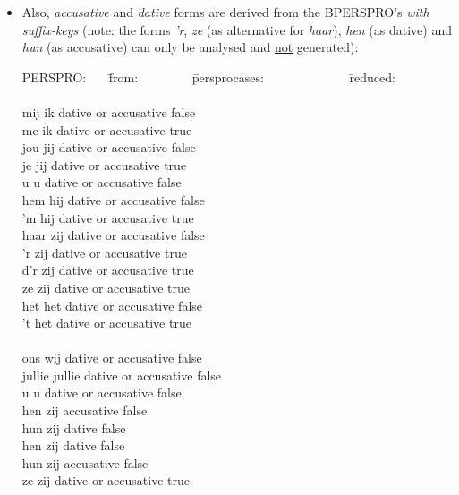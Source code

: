 \begin{itemize}
  \item Also, {\em accusative} and {\em dative} forms are derived from the 
        BPERSPRO's {\em with suffix-keys} (note: the forms
        {\em 'r}, {\em ze} (as alternative for {\em haar}), 
        {\em hen} (as dative) and {\em hun} (as accusative) can only be 
        analysed and \underline{not} generated):

\begin{tabbing}
PERSPRO: \ \ \  \= from: \ \ \ \ \ \ \ \ \= persprocases: \ \ \ \ \ \ \  
\ \ \ \ \ \  \= reduced: \\
         \>                \>                    \>       \\
mij      \> ik             \> dative or accusative  \> false \\
me       \> ik             \> dative or accusative  \> true  \\
jou      \> jij            \> dative or accusative  \> false \\
je       \> jij            \> dative or accusative  \> true  \\
u        \> u              \> dative or accusative  \> false \\
hem      \> hij            \> dative or accusative  \> false \\
'm       \> hij            \> dative or accusative  \> true  \\  
haar     \> zij            \> dative or accusative  \> false \\
'r       \> zij            \> dative or accusative  \> true  \\
d'r      \> zij            \> dative or accusative  \> true  \\
ze       \> zij            \> dative or accusative  \> true  \\
het      \> het            \> dative or accusative  \> false \\
't       \> het            \> dative or accusative  \> true  \\  
         \>                \>                       \>       \\
ons      \> wij            \> dative or accusative  \> false \\
jullie   \> jullie         \> dative or accusative  \> false \\
u        \> u              \> dative or accusative  \> false \\
hen      \> zij            \> accusative            \> false \\
hun      \> zij            \> dative                \> false \\
hen      \> zij            \> dative                \> false \\
hun      \> zij            \> accusative            \> false \\
ze       \> zij            \> dative or accusative  \> true  \\
\end{tabbing}


\end{itemize}
